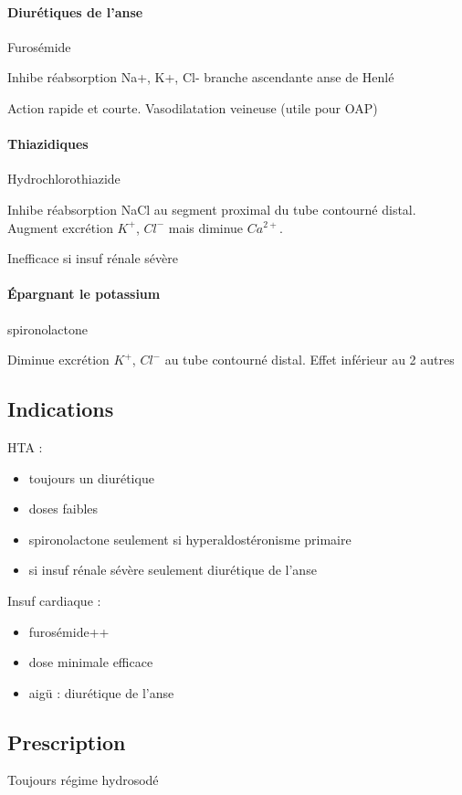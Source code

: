 \documentclass{article}
\begin{document}
\paragraph{Diurétiques de l'anse} Furosémide

Inhibe réabsorption Na+, K+, Cl- branche ascendante anse de Henlé

Action rapide et courte. Vasodilatation veineuse (utile pour OAP)

\paragraph{Thiazidiques} Hydrochlorothiazide

Inhibe réabsorption NaCl au segment proximal du tube contourné distal. Augment
excrétion $K^+$, $Cl^-$ mais diminue $Ca^{2+}$.

Inefficace si insuf rénale sévère

\paragraph{Épargnant le potassium} spironolactone

Diminue excrétion $K^+$, $Cl^-$ au tube contourné distal. Effet inférieur au 2
autres

\subsection{Indications}
HTA : 
\begin{itemize}
  \item toujours un diurétique
  \item doses faibles
  \item spironolactone seulement si hyperaldostéronisme primaire
  \item si insuf rénale sévère seulement diurétique de l'anse
\end{itemize}
Insuf cardiaque :
\begin{itemize}
  \item furosémide++
  \item dose minimale efficace
  \item aigü : diurétique de l'anse 
\end{itemize}

\subsection{Prescription}
Toujours régime hydrosodé
\end{document}
